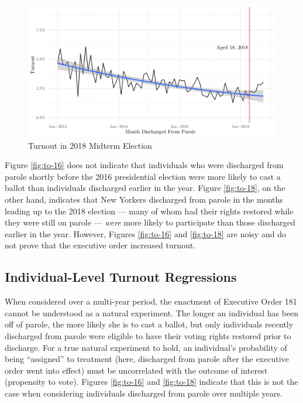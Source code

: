 \documentclass[
  12pt,
]{article}
\begin{document}
\begin{figure}[H]

{\centering \includegraphics{felony_disenfranchisement_nys_files/figure-latex/to-18-chart-1} 

}

\caption{\label{fig:to-18}Turnout in 2018 Midterm Election}\label{fig:to-18-chart}
\end{figure}

Figure \ref{fig:to-16} does not indicate that individuals who were discharged from parole shortly before the 2016 presidential election were more likely to cast a ballot than individuals discharged earlier in the year. Figure \ref{fig:to-18}, on the other hand, indicates that New Yorkers discharged from parole in the months leading up to the 2018 election --- many of whom had their rights restored while they were still on parole --- \emph{were} more likely to participate than those discharged earlier in the year. However, Figures \ref{fig:to-16} and \ref{fig:to-18} are noisy and do not prove that the executive order increased turnout.

\hypertarget{individual-level-turnout-regressions}{%
\subsection*{Individual-Level Turnout Regressions}\label{individual-level-turnout-regressions}}

When considered over a multi-year period, the enactment of Executive Order 181 cannot be understood as a natural experiment. The longer an individual has been off of parole, the more likely she is to cast a ballot, but only individuals recently discharged from parole were eligible to have their voting rights restored prior to discharge. For a true natural experiment to hold, an individual's probability of being ``assigned'' to treatment (here, discharged from parole after the executive order went into effect) must be uncorrelated with the outcome of interest (propensity to vote). Figures \ref{fig:to-16} and \ref{fig:to-18} indicate that this is not the case when considering individuals discharged from parole over multiple years.
\end{document}
